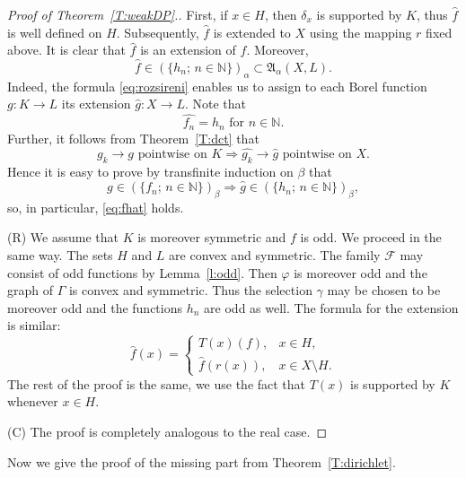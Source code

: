 \documentclass{amsart}
\numberwithin{equation}{section}
\theoremstyle{definition}
\def\fra{\mathfrak{A}}
\def\F{\mathcal F}
\def\en{\mathbb N}
\newcommand{\setsep}{;\,}
\begin{document}
\begin{proof}[Proof of Theorem~\ref{T:weakDP}.]
First, if $x\in H$, then  $\delta_x$  is supported by $K$, thus $\hat{f}$ is well defined on $H$. Subsequently, $\hat{f}$ is extended to $X$ using the mapping $r$ fixed above. It is clear that $\hat{f}$ is an extension of $f$. Moreover,
\begin{equation}
\label{eq:fhat}
\hat{f}\in\left(\{h_n\setsep n\in\en\}\right)_\alpha\subset\fra_{\alpha}(X,L).\end{equation}
Indeed, the formula \eqref{eq:rozsireni} enables us to assign to each Borel function $g\colon K\to L$ its extension $\hat{g}\colon X\to L$. Note that 
$$\hat{f_n}=h_n \mbox{ for }n\in\en.$$ 
Further, it follows from Theorem~\ref{T:dct} that
$$g_k\to g\mbox{ pointwise on }K\Rightarrow \hat{g_k}\to\hat{g}\mbox{ pointwise on }X.$$
Hence it is easy to prove by transfinite induction on $\beta$ that
$$g\in\left(\{f_n\setsep n\in\en\}\right)_\beta\Rightarrow\hat{g}\in\left(\{h_n\setsep n\in\en\}\right)_\beta,$$
so, in particular, \eqref{eq:fhat} holds.


(R) We assume that $K$ is moreover symmetric and $f$ is odd. We proceed in the same way. The sets $H$ and $L$ are convex and symmetric. The family $\F$ may consist of odd functions by Lemma~\ref{l:odd}. Then $\varphi$ is moreover odd and the graph of $\Gamma$ is convex and symmetric. Thus the selection $\gamma$ may be chosen to be moreover odd and the functions $h_n$ are odd as well. The formula for the extension is similar:
$$\hat{f}(x)=\begin{cases} T(x)(f), & x\in H,\\ \hat{f}(r(x)), & x\in X\setminus H.\end{cases}$$
The rest of the proof is the same, we use the fact that $T(x)$ is supported by $K$ whenever $x\in H$.

(C) The proof is completely analogous to the real case.
\end{proof}


Now we give the proof of the missing part from Theorem~\ref{T:dirichlet}.
\end{document}
